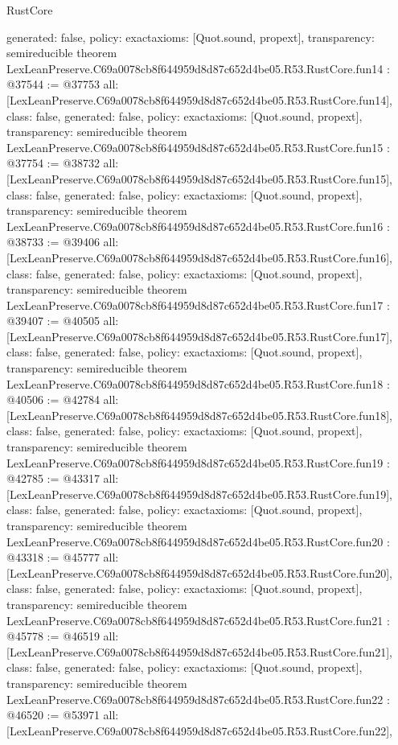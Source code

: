 \begin{lexlean}{RustCore}
\begin{coremodule}
{  generated: false,
  policy: exact{axioms: [Quot.sound, propext]},
  transparency: semireducible
}
theorem LexLeanPreserve.C69a0078cb8f644959d8d87c652d4be05.R53.RustCore.fun14 : @37544 := @37753 {
  all: [LexLeanPreserve.C69a0078cb8f644959d8d87c652d4be05.R53.RustCore.fun14],
  class: false,
  generated: false,
  policy: exact{axioms: [Quot.sound, propext]},
  transparency: semireducible
}
theorem LexLeanPreserve.C69a0078cb8f644959d8d87c652d4be05.R53.RustCore.fun15 : @37754 := @38732 {
  all: [LexLeanPreserve.C69a0078cb8f644959d8d87c652d4be05.R53.RustCore.fun15],
  class: false,
  generated: false,
  policy: exact{axioms: [Quot.sound, propext]},
  transparency: semireducible
}
theorem LexLeanPreserve.C69a0078cb8f644959d8d87c652d4be05.R53.RustCore.fun16 : @38733 := @39406 {
  all: [LexLeanPreserve.C69a0078cb8f644959d8d87c652d4be05.R53.RustCore.fun16],
  class: false,
  generated: false,
  policy: exact{axioms: [Quot.sound, propext]},
  transparency: semireducible
}
theorem LexLeanPreserve.C69a0078cb8f644959d8d87c652d4be05.R53.RustCore.fun17 : @39407 := @40505 {
  all: [LexLeanPreserve.C69a0078cb8f644959d8d87c652d4be05.R53.RustCore.fun17],
  class: false,
  generated: false,
  policy: exact{axioms: [Quot.sound, propext]},
  transparency: semireducible
}
theorem LexLeanPreserve.C69a0078cb8f644959d8d87c652d4be05.R53.RustCore.fun18 : @40506 := @42784 {
  all: [LexLeanPreserve.C69a0078cb8f644959d8d87c652d4be05.R53.RustCore.fun18],
  class: false,
  generated: false,
  policy: exact{axioms: [Quot.sound, propext]},
  transparency: semireducible
}
theorem LexLeanPreserve.C69a0078cb8f644959d8d87c652d4be05.R53.RustCore.fun19 : @42785 := @43317 {
  all: [LexLeanPreserve.C69a0078cb8f644959d8d87c652d4be05.R53.RustCore.fun19],
  class: false,
  generated: false,
  policy: exact{axioms: [Quot.sound, propext]},
  transparency: semireducible
}
theorem LexLeanPreserve.C69a0078cb8f644959d8d87c652d4be05.R53.RustCore.fun20 : @43318 := @45777 {
  all: [LexLeanPreserve.C69a0078cb8f644959d8d87c652d4be05.R53.RustCore.fun20],
  class: false,
  generated: false,
  policy: exact{axioms: [Quot.sound, propext]},
  transparency: semireducible
}
theorem LexLeanPreserve.C69a0078cb8f644959d8d87c652d4be05.R53.RustCore.fun21 : @45778 := @46519 {
  all: [LexLeanPreserve.C69a0078cb8f644959d8d87c652d4be05.R53.RustCore.fun21],
  class: false,
  generated: false,
  policy: exact{axioms: [Quot.sound, propext]},
  transparency: semireducible
}
theorem LexLeanPreserve.C69a0078cb8f644959d8d87c652d4be05.R53.RustCore.fun22 : @46520 := @53971 {
  all: [LexLeanPreserve.C69a0078cb8f644959d8d87c652d4be05.R53.RustCore.fun22],
}
\end{coremodule}
\end{lexlean}
